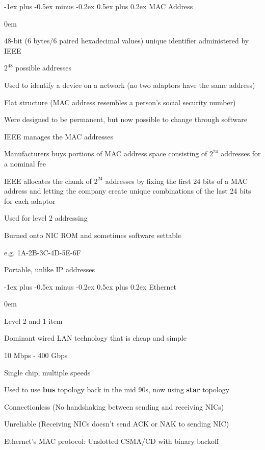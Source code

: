 \documentclass[letterpaper,8pt]{extarticle}
\makeatletter
\renewcommand{\subsection}{\@startsection{subsection}{2}{0mm}%
  {-1ex plus -0.5ex minus -0.2ex}%
  {0.5ex plus 0.2ex}%
{\color{h2}\normalfont\fontsize{6}{6}\selectfont\bfseries}}
\let\olditemize\itemize \let\endolditemize\enditemize
\renewenvironment{itemize}{\olditemize \itemsep0em}{\endolditemize}
\makeatother
\begin{document}
\begin{multicols*}{5}
  \subsection{MAC Address}
  
  \begin{itemize}
    \item 48-bit (6 bytes/6 paired hexadecimal values) unique identifier administered by IEEE
    \item $2^{48}$ possible addresses
    \item Used to identify a device on a network (no two adaptors have the same address)
    \item Flat structure (MAC address resembles a person's social security number)
    \item Were designed to be permanent, but now possible to change through software
    \item IEEE manages the MAC addresses
    \item Manufacturers buys portions of MAC address space consisting of $2^{24}$ addresses for a nominal fee
    \item IEEE allocates the chunk of $2^{24}$ addresses by fixing the first 24 bits of a MAC address and letting the company create unique combinations of the last 24 bits for each adaptor
    \item Used for level 2 addressing
    \item Burned onto NIC ROM and sometimes software settable
    \item e.g. 1A-2B-3C-4D-5E-6F
          
    \item Portable, unlike IP addresses
  \end{itemize}
  
  \subsection{Ethernet}
  
  \begin{itemize}
    \item Level 2 and 1 item
    \item Dominant wired LAN technology that is cheap and simple
    \item 10 Mbps - 400 Gbps
    \item Single chip, multiple speeds
    \item Used to use \textbf{bus} topology back in the mid 90s, now using \textbf{star} topology
    \item Connectionless (No handshaking between sending and receiving NICs)
    \item Unreliable (Receiving NICs doesn't send ACK or NAK to sending NIC)
    \item Ethernet's MAC protocol: Unslotted CSMA/CD with binary backoff
  \end{itemize}
  

\end{multicols*}
\end{document}

